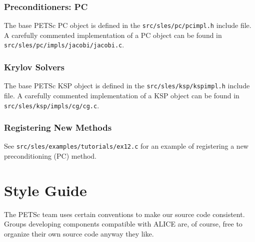 \documentclass[twoside,12pt]{../sty/report_petsc}
\begin{document}
\subsection{Preconditioners: PC}
The base PETSc PC object is defined in the {\tt src/sles/pc/pcimpl.h} include file. 
A carefully commented implementation of a PC object can be found in 
{\tt src/sles/pc/impls/jacobi/jacobi.c}. 

\subsection{Krylov Solvers}
The base PETSc KSP object is defined in the {\tt src/sles/ksp/kspimpl.h} include file. 
A carefully commented implementation of a KSP object can be found in 
{\tt src/sles/ksp/impls/cg/cg.c}. 

\subsection{Registering New Methods}
\label{sec:registeringnewmethods}

See {\tt src/sles/examples/tutorials/ex12.c} for an example of registering a new
preconditioning (PC) method.


\chapter{Style Guide}

The PETSc team uses certain conventions to make our source code consistent. Groups
developing components compatible with ALICE are, of course, free to organize their
own source code anyway they like.
\end{document}
